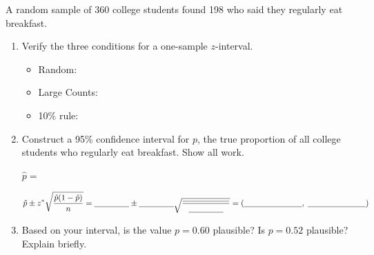 \documentclass[10pt]{article}
\begin{document}
\namedateperiod

\vspace{0.15in}

A random sample of 360 college students found 198 who said they regularly eat breakfast.

\begin{enumerate}
  \item Verify the three conditions for a one-sample $z$-interval.
        \begin{itemize}
          \item Random: \blank{7cm}
          \item Large Counts: \blank{7cm}
          \item 10\% rule: \blank{5cm}
        \end{itemize}

  \item Construct a 95\% confidence interval for $p$, the true proportion of all college
        students who regularly eat breakfast. Show all work.

        $\hat p = $ \blank{2.5cm}

        \[
          \hat p \pm z^* \sqrt{\frac{\hat p(1-\hat p)}{n}}
          = \blank{1.5cm} \pm \blank{1.5cm}\sqrt{\frac{\blank{2cm}}{\blank{1.5cm}}}
          = (\blank{2.5cm},\; \blank{2.5cm})
        \]

  \item Based on your interval, is the value $p = 0.60$ plausible? Is $p = 0.52$ plausible?
        Explain briefly.

\end{enumerate}
\end{document}
